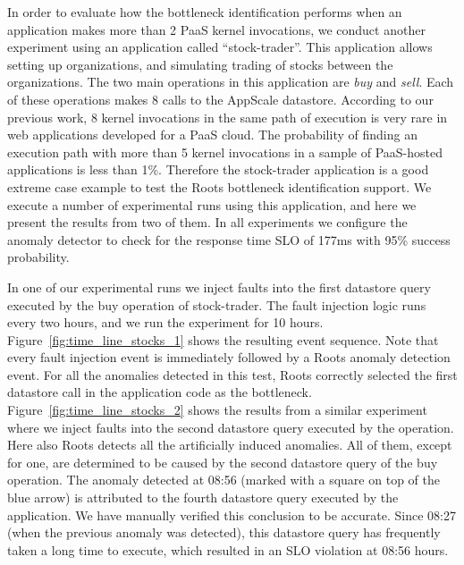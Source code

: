 In order to evaluate how the bottleneck identification performs when an application makes more than 2
PaaS kernel invocations, we conduct another experiment using an application called ``stock-trader''.
This application allows setting up organizations, and simulating trading of stocks between the
organizations. The two main operations in this application are \textit{buy} and \textit{sell}. Each of
these operations makes 8 calls to the AppScale datastore. 
According to our previous work, 8 kernel invocations in the
same path of execution is very rare in web applications developed for a PaaS cloud. The probability
of finding an execution path with more than 5 kernel invocations in a sample of PaaS-hosted
applications is less than 1\%. Therefore the stock-trader application is a good extreme case
example to test the Roots bottleneck identification support.
We execute a number of experimental runs using this application,
and here we present the results from two of them. In all experiments we configure the anomaly
detector to check for the response time SLO of 177ms with 95\% success probability.

In one of our experimental runs we inject faults into the first datastore query executed by the buy operation
of stock-trader. The fault injection logic runs every two hours, and we run the experiment for 10 hours. 
Figure~\ref{fig:time_line_stocks_1} shows the resulting event sequence. Note that every fault injection
event is immediately followed by a Roots anomaly detection event. For all the anomalies detected
in this test, Roots correctly selected the first datastore call in the application code as the bottleneck. 
Figure~\ref{fig:time_line_stocks_2} shows the results from a similar experiment where we inject
faults into the second datastore query executed by the operation. Here also Roots detects all the
artificially induced anomalies. All of them, except for one, are determined to be caused by the second
datastore query of the buy operation. The anomaly detected at 08:56 (marked with a square on top of the blue arrow) 
is attributed to the fourth datastore query executed by the application. We have manually verified this
conclusion to be accurate. Since 08:27 (when the previous anomaly was detected), this datastore
query has frequently taken a long time to execute, which resulted in an SLO violation at 08:56 hours.